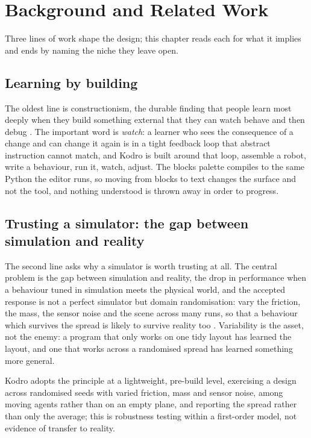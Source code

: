 \documentclass[11pt,a4paper]{report}
\begin{document}
\chapter{Background and Related Work}

Three lines of work shape the design; this chapter reads each for what it implies and ends by naming the niche they leave open.

\section{Learning by building}
 The oldest line is constructionism, the durable finding that people learn most deeply when they build something external that they can watch behave and then debug \citep{papert1980}. The important word is \emph{watch}: a learner who sees the consequence of a change and can change it again is in a tight feedback loop that abstract instruction cannot match, and Kodro is built around that loop, assemble a robot, write a behaviour, run it, watch, adjust. The blocks palette compiles to the same Python the editor runs, so moving from blocks to text changes the surface and not the tool, and nothing understood is thrown away in order to progress.

\section{Trusting a simulator: the gap between simulation and reality}
The second line asks why a simulator is worth trusting at all. The central problem is the gap between simulation and reality, the drop in performance when a behaviour tuned in simulation meets the physical world, and the accepted response is not a perfect simulator but domain randomisation: vary the friction, the mass, the sensor noise and the scene across many runs, so that a behaviour which survives the spread is likely to survive reality too \citep{tobin2017}. Variability is the asset, not the enemy: a program that only works on one tidy layout has learned the layout, and one that works across a randomised spread has learned something more general.

Kodro adopts the principle at a lightweight, pre-build level, exercising a design across randomised seeds with varied friction, mass and sensor noise, among moving agents rather than on an empty plane, and reporting the spread rather than only the average; this is robustness testing within a first-order model, not evidence of transfer to reality.
\end{document}
